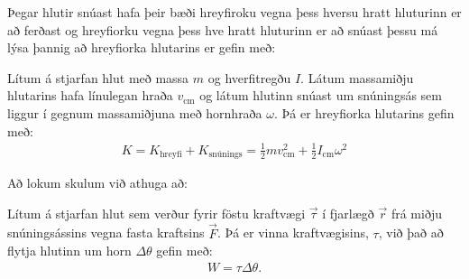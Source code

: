 Þegar hlutir snúast hafa þeir bæði hreyfiroku vegna þess hversu hratt hluturinn er að ferðast og hreyfiorku vegna þess hve hratt hluturinn er að snúast þessu má lýsa þannig að hreyfiorka hlutarins er gefin með:

\begin{tcolorbox}
\begin{definition}
Lítum á stjarfan hlut með massa $m$ og hverfitregðu $I$. Látum massamiðju hlutarins hafa línulegan hraða $v_{\text{cm}}$ og látum hlutinn snúast um snúningsás sem liggur í gegnum massamiðjuna með hornhraða $\omega$. Þá er hreyfiorka hlutarins gefin með:
\begin{align*}
    K = K_{\text{hreyfi}} + K_{\text{snúnings}} = \frac{1}{2}mv_{\text{cm}}^2 + \frac{1}{2}I_{\text{cm}}\omega^2
\end{align*}
\end{definition}
\end{tcolorbox}

Að lokum skulum við athuga að:

\begin{tcolorbox}
\begin{theorem}
Lítum á stjarfan hlut sem verður fyrir föstu kraftvægi $\vec{\tau}$ í fjarlægð $\vec{r}$ frá miðju snúningsássins vegna fasta kraftsins $\vec{F}$. Þá er vinna kraftvægisins, $\tau$, við það að flytja hlutinn um horn $\Delta \theta$ gefin með:
\begin{align*}
    W = \tau \Delta \theta.
\end{align*}
\end{theorem}
\end{tcolorbox}

